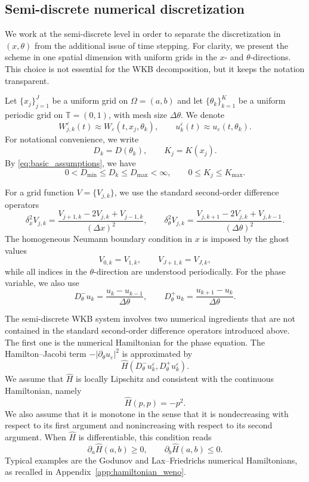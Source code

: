 \documentclass[11pt]{article}
\begin{document}
\subsection{Semi-discrete numerical discretization}

We work at the semi-discrete level in order to separate the discretization in
\((x,\theta)\) from the additional issue of time stepping. For clarity, we
present the scheme in one spatial dimension with uniform grids in the
\(x\)- and \(\theta\)-directions. This choice is not essential for the WKB
decomposition, but it keeps the notation transparent.

Let \(\{x_j\}_{j=1}^J\) be a uniform grid on \(\Omega=(a,b)\) and let
\(\{\theta_k\}_{k=1}^K\) be a uniform periodic grid on \(\mathbb T=(0,1)\),
with mesh size \(\Delta\theta\). We denote
\[
W_{j,k}^\varepsilon(t)\approx W_\varepsilon(t,x_j,\theta_k),
\qquad
u_k^\varepsilon(t)\approx u_\varepsilon(t,\theta_k).
\]
For notational convenience, we write
\[
D_k=D(\theta_k),
\qquad
K_j=K(x_j).
\]
By \eqref{eq:basic_assumptions}, we have 
\[
    0<D_{\min}\le D_k\le D_{\max}<\infty,
    \qquad
    0\le K_j\le K_{\max}.
\]


For a grid function \(V=\{V_{j,k}\}\), we use the standard second-order
difference operators
\[
\delta_x^2 V_{j,k}
=
\frac{V_{j+1,k}-2V_{j,k}+V_{j-1,k}}{(\Delta x)^2},
\qquad
\delta_\theta^2 V_{j,k}
=
\frac{V_{j,k+1}-2V_{j,k}+V_{j,k-1}}{(\Delta\theta)^2}.
\]
The homogeneous Neumann boundary condition in \(x\) is imposed by the ghost
values
\[
V_{0,k}=V_{1,k},
\qquad
V_{J+1,k}=V_{J,k},
\]
while all indices in the \(\theta\)-direction are understood periodically.
For the phase variable, we also use
\[
D_\theta^-u_k
=
\frac{u_k-u_{k-1}}{\Delta\theta},
\qquad
D_\theta^+u_k
=
\frac{u_{k+1}-u_k}{\Delta\theta}.
\]

The semi-discrete WKB system involves two numerical ingredients that are not
contained in the standard second-order difference operators introduced above.
The first one is the numerical Hamiltonian for the phase equation. The
Hamilton--Jacobi term \(-|\partial_\theta u_\varepsilon|^2\) is approximated by
\[
\widehat H(D_\theta^-u_k^\varepsilon,D_\theta^+u_k^\varepsilon).
\]
We assume that \(\widehat H\) is locally Lipschitz and consistent with the
continuous Hamiltonian, namely
\[
\widehat H(p,p)=-p^2 .
\]
We also assume that it is monotone in the sense that it is nondecreasing with
respect to its first argument and nonincreasing with respect to its second
argument. When \(\widehat H\) is differentiable, this condition reads
\[
\partial_a\widehat H(a,b)\ge0,
\qquad
\partial_b\widehat H(a,b)\le0 .
\]
Typical examples are the Godunov and Lax--Friedrichs numerical Hamiltonians,
as recalled in Appendix~\ref{app:hamiltonian_weno}.
\end{document}
